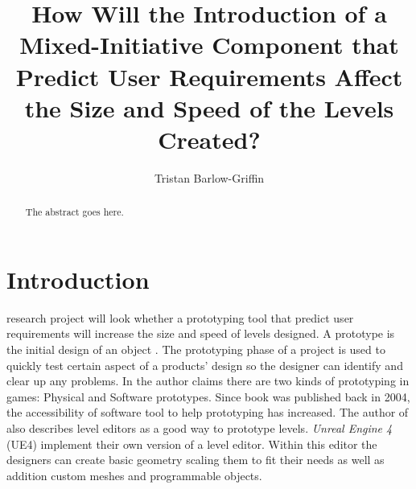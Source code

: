 \documentclass[journal]{IEEEtran}
\begin{document}
%
\title{ How Will the Introduction of a Mixed-Initiative Component that Predict User Requirements Affect the Size and Speed of the Levels Created?}
%
%

\author{Tristan Barlow-Griffin}


\maketitle

\begin{abstract}
The abstract goes here.
\end{abstract}





\section{Introduction}
 research project will look whether a prototyping tool that predict user requirements will increase the size and speed of levels designed. A prototype is the initial design of an object \cite{prototype}. The prototyping phase of a project is used to quickly test certain aspect of a products' design so the designer can identify and clear up any problems\cite{budde1992prototyping}. In \cite[p.~150]{fullerton2004game} the author claims there are two kinds of prototyping in games: Physical and Software prototypes. Since book was published back in 2004, the accessibility of software tool to help prototyping has increased. The author of \cite[p.~164]{fullerton2004game} also describes level editors as a good way to prototype levels. \textit{Unreal Engine 4} (UE4) implement their own version of a level editor. Within this editor the designers can create basic geometry scaling them to fit their needs as well as addition custom meshes and programmable objects.
\end{document}
